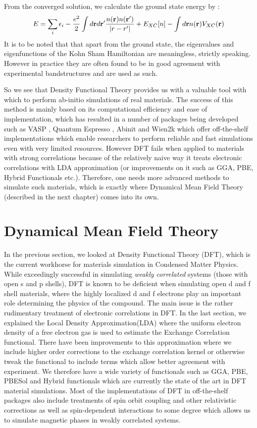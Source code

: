 \documentclass[10pt]{ruthesis}
\begin{document}
From the converged solution, we calculate the ground state energy by :
\begin{equation}
E=\sum_i \epsilon_i - \dfrac{e^2}{2}\int d\mathbf{r} d\mathbf{r}' \dfrac{n(\mathbf{r}) n(\mathbf{r}')}{|r-r'|} +E_{XC}[n] -\int d \mathbf{r} n(\mathbf{r}) V_{XC}(\mathbf{r})
\end{equation}
It is to be noted that that apart from the ground state, the eigenvalues and eigenfunctions of the Kohn Sham Hamiltonian are meaningless, strictly speaking. However in practice they are often found to be in good agreement with experimental bandstructures and are used as such.

So we see that Density Functional Theory provides us with a valuable tool with which to perform ab-initio simulations of real materials. The success of this method is mainly based on its computational efficiency and ease of implementation, which has resulted in a number of packages being developed such as VASP \cite{Vasp}, Quantum Espresso \cite{Quantum_Espresso}, Abinit \cite{Abinit} and Wien2k \cite{wien2k} which offer off-the-shelf implementations which enable researchers to perform reliable and fast simulations even with very limited resources. However DFT fails when applied to materials with strong correlations because of the relatively naive way it treats electronic correlations with LDA approximation (or improvements on it such as GGA, PBE, Hybrid Functionals etc.). Therefore, one needs more advanced methods to simulate such materials, which is exactly where Dynamical Mean Field Theory (described in the next chapter) comes into its own. 

\pagebreak
\chapter{Dynamical Mean Field Theory}

In the previous section, we looked at Density Functional Theory (DFT), which is the current workhorse for materials simulation in Condensed Matter Physics. While exceedingly successful in simulating \textit{weakly correlated} systems (those with open s and p shells), DFT is known to be deficient when simulating open d and f shell materials, where the highly localized d and f electrons play an important role determining the physics of the compound. The main issue is the rather rudimentary treatment of electronic correlations in DFT. In the last section, we explained the Local Density Approximation(LDA) where the uniform electron density of a free electron gas is used to estimate the Exchange Correlation functional. There have been improvements to this approximation where we include higher order corrections to the exchange correlation kernel or otherwise tweak the functional to include terms which allow better agreement with experiment. We therefore have a wide variety of functionals such as GGA, PBE, PBESol and Hybrid functionals which are currently the state of the art in DFT material simulations. Most of the implementations of DFT in off-the-shelf packages also include treatments of spin orbit coupling and other relativistic corrections as well as spin-dependent interactions to some degree which allows us to simulate magnetic phases in weakly correlated systems.
\end{document}
